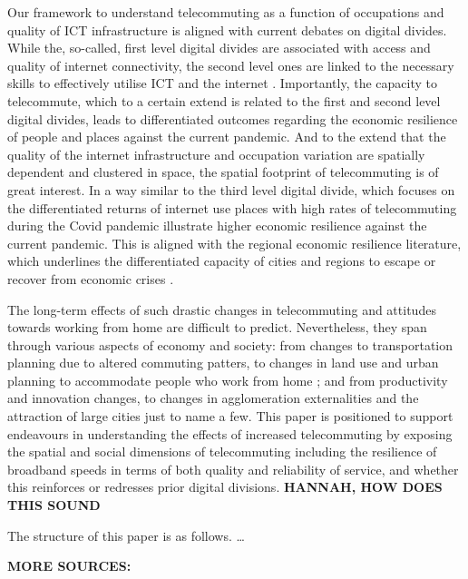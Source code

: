 \documentclass[]{interact}
\theoremstyle{plain}%
\theoremstyle{definition}
\theoremstyle{remark}
\begin{document}
Our framework to understand telecommuting as a function of occupations
and quality of ICT infrastructure is aligned with current debates on
digital divides. While the, so-called, first level digital divides are
associated with access and quality of internet connectivity, the second
level ones are linked to the necessary skills to effectively utilise ICT
and the internet \citep{blank2014dimensions, van2011internet}.
Importantly, the capacity to telecommute, which to a certain extend is
related to the first and second level digital divides, leads to
differentiated outcomes regarding the economic resilience of people and
places against the current pandemic. And to the extend that the quality
of the internet infrastructure and occupation variation are spatially
dependent and clustered in space, the spatial footprint of telecommuting
is of great interest. In a way similar to the third level digital
divide, which focuses on the differentiated returns of internet use
\citep{stern2009levels, van2014digital, van2015third} places with high
rates of telecommuting during the Covid pandemic illustrate higher
economic resilience against the current pandemic. This is aligned with
the regional economic resilience literature, which underlines the
differentiated capacity of cities and regions to escape or recover from
economic crises \citep{martin2012regional, kitsos2018economic}.

The long-term effects of such drastic changes in telecommuting and
attitudes towards working from home are difficult to predict.
Nevertheless, they span through various aspects of economy and society:
from changes to transportation planning due to altered commuting
patters, to changes in land use and urban planning to accommodate people
who work from home \citep{BUDNITZ2020102713}; and from productivity and
innovation changes, to changes in agglomeration externalities and the
attraction of large cities \citep{econobs} just to name a few. This
paper is positioned to support endeavours in understanding the effects
of increased telecommuting by exposing the spatial and social dimensions
of telecommuting including the resilience of broadband speeds in terms
of both quality and reliability of service, and whether this reinforces
or redresses prior digital divisions. \textbf{HANNAH, HOW DOES THIS
SOUND}

The structure of this paper is as follows. \ldots{}

\textbf{MORE SOURCES:}
\end{document}
